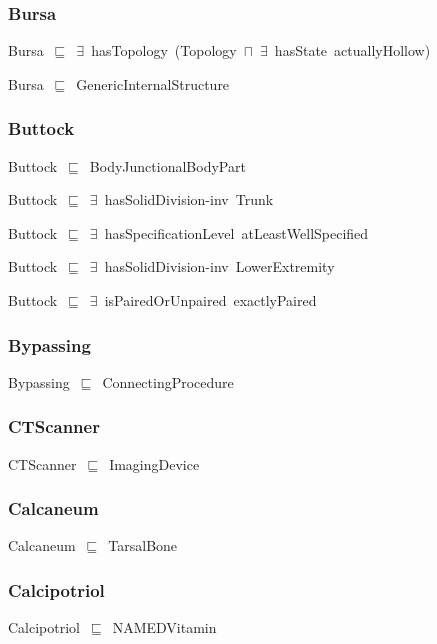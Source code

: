 \documentclass{article}
\begin{document}
\subsubsection*{Bursa}

Bursa~\ensuremath{\sqsubseteq}~\ensuremath{\exists}~hasTopology~(Topology~\ensuremath{\sqcap}~\ensuremath{\exists}~hasState~actuallyHollow)~

Bursa~\ensuremath{\sqsubseteq}~GenericInternalStructure~

\subsubsection*{Buttock}

Buttock~\ensuremath{\sqsubseteq}~BodyJunctionalBodyPart~

Buttock~\ensuremath{\sqsubseteq}~\ensuremath{\exists}~hasSolidDivision-inv~Trunk~

Buttock~\ensuremath{\sqsubseteq}~\ensuremath{\exists}~hasSpecificationLevel~atLeastWellSpecified~

Buttock~\ensuremath{\sqsubseteq}~\ensuremath{\exists}~hasSolidDivision-inv~LowerExtremity~

Buttock~\ensuremath{\sqsubseteq}~\ensuremath{\exists}~isPairedOrUnpaired~exactlyPaired~

\subsubsection*{Bypassing}

Bypassing~\ensuremath{\sqsubseteq}~ConnectingProcedure~

\subsubsection*{CTScanner}

CTScanner~\ensuremath{\sqsubseteq}~ImagingDevice~

\subsubsection*{Calcaneum}

Calcaneum~\ensuremath{\sqsubseteq}~TarsalBone~

\subsubsection*{Calcipotriol}

Calcipotriol~\ensuremath{\sqsubseteq}~NAMEDVitamin~
\end{document}
